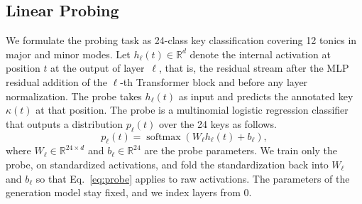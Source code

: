 \documentclass{article}
\begin{document}
\subsection{Linear Probing}
\label{sec:probe}
We formulate the probing task as 24-class key classification covering 12 tonics in major and minor modes.
Let $h_\ell(t) \in \mathbb{R}^{d}$ denote the internal activation at position $t$ at the output of layer~$\ell$, that is, the residual stream after the MLP residual addition of the $\ell$-th Transformer block and before any layer normalization.
The probe takes $h_\ell(t)$ as input and predicts the annotated key $\kappa(t)$ at that position.
The probe is a multinomial logistic regression classifier that outputs a distribution $p_\ell(t)$ over the 24 keys as follows.
\begin{equation}
p_\ell(t) = \operatorname{softmax}\left( W_\ell h_\ell(t) + b_\ell \right),
\label{eq:probe}
\end{equation}
where $W_\ell \in \mathbb{R}^{24 \times d}$ and $b_\ell \in \mathbb{R}^{24}$ are the probe parameters.
We train only the probe, on standardized activations, and fold the standardization back into $W_\ell$ and $b_\ell$ so that Eq.~\eqref{eq:probe} applies to raw activations.
The parameters of the generation model stay fixed, and we index layers from $0$.
\end{document}
